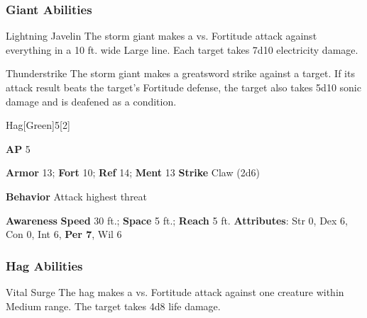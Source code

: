 \subsubsection{Giant Abilities}

\begin{ability}{Lightning Javelin}
The storm giant makes a  vs. Fortitude attack against everything in a 10 ft. wide Large line.
\hit Each target takes 7d10 electricity damage.
\end{ability}

\vspace{0.5em}
\begin{ability}{Thunderstrike}
The storm giant makes a greatsword strike against a target.
If its attack result beats the target's Fortitude defense,
the target also takes 5d10 sonic damage
and is deafened as a condition.
\end{ability}

\begin{monsection}{Hag}[Green]{5}[2]
\vspace{-1em}\vspace{-1em}
\begin{spellcontent}
\begin{spelltargetinginfo}
{\textbf{AP} 5}

\pari \textbf{Armor} 13;
\textbf{Fort} 10;
\textbf{Ref} 14;
\textbf{Ment} 13
\pari \textbf{Strike} Claw  (2d6)



\pari \textbf{Behavior} Attack highest threat
\end{spelltargetinginfo}
\end{spellcontent}

\begin{monsterfooter}
\pari \textbf{Awareness} 
\pari \textbf{Speed} 30 ft.;
\textbf{Space} 5 ft.;
\textbf{Reach} 5 ft.
\pari \textbf{Attributes}:
Str 0,
Dex 6,
Con 0,
Int 6,
\textbf{Per 7},
Wil 6
\end{monsterfooter}
\end{monsection}


\subsubsection{Hag Abilities}

\begin{ability}{Vital Surge}
The hag makes a  vs. Fortitude attack against one creature within Medium range.
\hit The target takes 4d8 life damage.
\end{ability}

